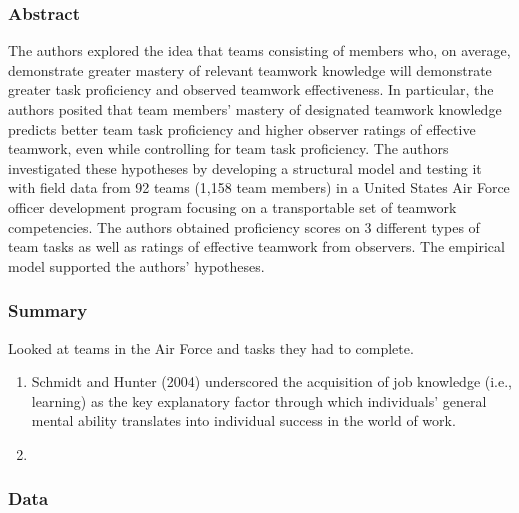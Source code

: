 \documentclass[12pt]{article}
\begin{document}
\subsubsection*{Abstract}
The authors explored the idea that teams consisting of members who, on average, demonstrate greater mastery of relevant teamwork knowledge will demonstrate greater task proficiency and observed teamwork effectiveness. In particular, the authors posited that team members’ mastery of designated teamwork knowledge predicts better team task proficiency and higher observer ratings of effective teamwork, even while controlling for team task proficiency. The authors investigated these hypotheses by developing a structural model and testing it with field data from 92 teams (1,158 team members) in a United States Air Force officer development program focusing on a transportable set of teamwork competencies. The authors obtained proficiency scores on 3 different types of team tasks as well as ratings of effective teamwork from observers. The empirical model supported the authors’ hypotheses.

\subsubsection*{Summary}

Looked at teams in the Air Force and tasks they had to complete. 
\begin{enumerate}
    \item Schmidt and Hunter (2004) underscored the acquisition of job knowledge (i.e., learning) as the key explanatory factor through which individuals’ general mental ability translates into individual success in the world of work.
    \item 
\end{enumerate}

\subsubsection*{Data}
\end{document}

